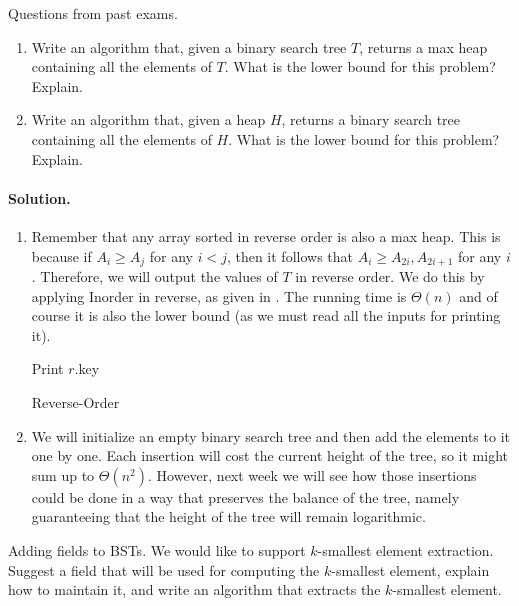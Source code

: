 \begin{example}Questions from past exams.
  \begin{enumerate}
    \item Write an algorithm that, given a binary search tree $T$, returns a max heap containing all the elements of $T$. What is the lower bound for this problem? Explain.
    \item Write an algorithm that, given a heap $H$, returns a binary search tree containing all the elements of $H$. What is the lower bound for this problem? Explain.
  \end{enumerate}
\end{example}

\paragraph{Solution.} 
  \begin{enumerate}
    \item Remember that any array sorted in reverse order is also a max heap. This is because if $A_{i} \ge A_{j}$ for any $i < j$, then it follows that $A_{i} \ge A_{2i}, A_{2i+1}$ for any $i$. Therefore, we will output the values of $T$ in reverse order. We do this by applying Inorder in reverse, as given in . The running time is $\Theta(n)$ and of course it is also the lower bound (as we must read all the inputs for printing it).
      \begin{algorithm}
       
       Print $r$.key \\
        \caption{Reverse-Order }
\label{alg:treetoheap}
      \end{algorithm}
    \item We will initialize an empty binary search tree and then add the elements to it one by one. Each insertion will cost the current height of the tree, so it might sum up to $\Theta(n^{2})$. However, next week we will see how those insertions could be done in a way that preserves the balance of the tree, namely guaranteeing that the height of the tree will remain logarithmic.
  \end{enumerate}

\begin{example} Adding fields to BSTs. We would like to support $k$-smallest element extraction. Suggest a field that will be used for computing the $k$-smallest element, explain how to maintain it, and write an algorithm that extracts the $k$-smallest element. 
\end{example}

